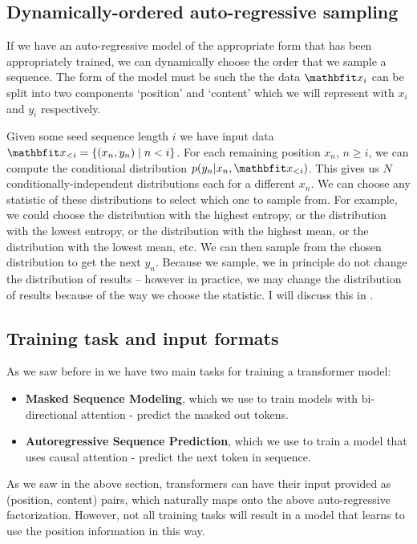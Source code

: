 \subsection{Dynamically-ordered auto-regressive sampling}

If we have an auto-regressive model of the appropriate form that has been appropriately trained, we can dynamically choose the order that we sample a sequence. The form of the model must be such the the data $\x_i$ can be split into two components `position' and `content' which we will represent with $x_i$ and $y_i$ respectively.

Given some seed sequence length $i$ we have input data $\x_{<i} = \{ (x_n, y_n) \mid n < i \}$. For each remaining position $x_n$, $n ≥ i$, we can compute the conditional distribution $p(y_n | x_n,  \x_{<i})$. This gives us $N$ conditionally-independent distributions each for a different $x_n$. We can choose any statistic of these distributions to select which one to sample from. For example, we could choose the distribution with the highest entropy, or the distribution with the lowest entropy, or the distribution with the highest mean, or the distribution with the lowest mean, etc. We can then sample from the chosen distribution to get the next $y_n$. Because we sample, we in principle do not change the distribution of results -- however in practice, we may change the distribution of results because of the way we choose the statistic. I will discuss this in .


\subsection{Training task and input formats}
\label{ss:transformer-inputs}

As we saw before in  we have two main tasks for training a transformer model:

\begin{itemize}
    \item \textbf{Masked Sequence Modeling}, which we use to train models with bi-directional attention - predict the masked out tokens.
    \item \textbf{Autoregressive Sequence Prediction}, which we use to train a model that uses causal attention - predict the next token in sequence.
\end{itemize}

As we saw in the above section, transformers can have their input provided as (position, content) pairs, which naturally maps onto the above auto-regressive factorization. However, not all training tasks will result in a model that learns to use the position information in this way.

